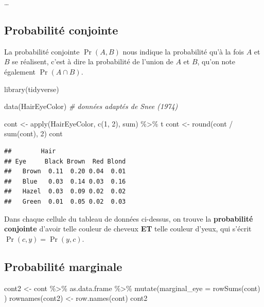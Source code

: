 \documentclass[
  a4paper,11pt,twoside,onecolumn,openright,final,oldfontcommands]{memoir}
\newenvironment{Shaded}{\begin{snugshade}}{\end{snugshade}}
\newcommand{\AttributeTok}[1]{\textcolor[rgb]{0.77,0.63,0.00}{#1}}
\newcommand{\CommentTok}[1]{\textcolor[rgb]{0.56,0.35,0.01}{\textit{#1}}}
\newcommand{\DecValTok}[1]{\textcolor[rgb]{0.00,0.00,0.81}{#1}}
\newcommand{\FunctionTok}[1]{\textcolor[rgb]{0.00,0.00,0.00}{#1}}
\newcommand{\NormalTok}[1]{#1}
\newcommand{\OtherTok}[1]{\textcolor[rgb]{0.56,0.35,0.01}{#1}}
\newcommand{\SpecialCharTok}[1]{\textcolor[rgb]{0.00,0.00,0.00}{#1}}
\theoremstyle{definition}
\theoremstyle{definition}
\theoremstyle{definition}
\theoremstyle{definition}
\theoremstyle{remark}
\begin{document}
\ldots{}

\hypertarget{probabilituxe9-conjointe}{%
\subsection{Probabilité conjointe}\label{probabilituxe9-conjointe}}

La probabilité conjointe \(\Pr(A, B)\) nous indique la probabilité qu'à la fois \(A\) et \(B\) se réalisent, c'est à dire la probabilité de l'union de \(A\) et \(B\), qu'on note également \(\Pr(A \cap B)\).

\begin{Shaded}
\begin{Highlighting}[]
\FunctionTok{library}\NormalTok{(tidyverse)}

\FunctionTok{data}\NormalTok{(HairEyeColor) }\CommentTok{\# données adaptés de Snee (1974)}

\NormalTok{cont }\OtherTok{\textless{}{-}} \FunctionTok{apply}\NormalTok{(HairEyeColor, }\FunctionTok{c}\NormalTok{(}\DecValTok{1}\NormalTok{, }\DecValTok{2}\NormalTok{), sum) }\SpecialCharTok{\%\textgreater{}\%}\NormalTok{ t }
\NormalTok{cont }\OtherTok{\textless{}{-}} \FunctionTok{round}\NormalTok{(cont }\SpecialCharTok{/} \FunctionTok{sum}\NormalTok{(cont), }\DecValTok{2}\NormalTok{)}
\NormalTok{cont}
\end{Highlighting}
\end{Shaded}

\begin{verbatim}
##        Hair
## Eye     Black Brown  Red Blond
##   Brown  0.11  0.20 0.04  0.01
##   Blue   0.03  0.14 0.03  0.16
##   Hazel  0.03  0.09 0.02  0.02
##   Green  0.01  0.05 0.02  0.03
\end{verbatim}

Dans chaque cellule du tableau de données ci-dessus, on trouve la \textbf{probabilité conjointe} d'avoir telle couleur de cheveux \textbf{ET} telle couleur d'yeux, qui s'écrit \(\Pr(c, y) = \Pr(y, c)\).

\hypertarget{probabilituxe9-marginale}{%
\subsection{Probabilité marginale}\label{probabilituxe9-marginale}}

\begin{Shaded}
\begin{Highlighting}[]
\NormalTok{cont2 }\OtherTok{\textless{}{-}}\NormalTok{ cont }\SpecialCharTok{\%\textgreater{}\%}\NormalTok{ as.data.frame }\SpecialCharTok{\%\textgreater{}\%} \FunctionTok{mutate}\NormalTok{(}\AttributeTok{marginal\_eye =} \FunctionTok{rowSums}\NormalTok{(cont) )}
\FunctionTok{rownames}\NormalTok{(cont2) }\OtherTok{\textless{}{-}} \FunctionTok{row.names}\NormalTok{(cont)}
\NormalTok{cont2}
\end{Highlighting}
\end{Shaded}
\end{document}
